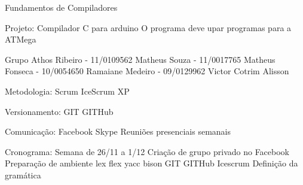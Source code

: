 Fundamentos de Compiladores

Projeto:
    Compilador C para arduino
    O programa deve upar programas para a ATMega

Grupo
    Athos Ribeiro - 11/0109562
    Matheus Souza - 11/0017765
    Matheus Fonseca - 10/0054650
    Ramaiane Medeiro - 09/0129962
    Victor Cotrim
    Alisson

Metodologia:
    Scrum
        IceScrum
    XP

Versionamento:
    GIT
        GITHub

Comunicação:
    Facebook
    Skype
    Reuniões presenciais semanais

Cronograma:
    Semana de 26/11 a 1/12
        Criação de grupo privado no Facebook
        Preparação de ambiente
            lex
                flex
            yacc
                bison
            GIT
            GITHub
            Icescrum
        Definição da gramática

